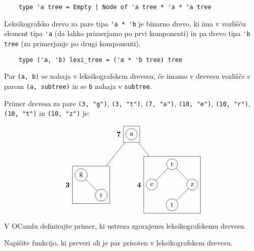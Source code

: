 \documentclass[arhiv]{../izpit}
\begin{document}
\begin{verbatim}
    type 'a tree = Empty | Node of 'a tree * 'a * 'a tree
\end{verbatim}

Leksikografsko drevo za pare tipa \verb|'a * 'b| je binarno drevo, ki ima v
vozlišču element tipa \verb|'a| (da lahko primerjamo po prvi komponenti) in pa drevo tipa \verb|'b tree| (za primerjanje po drugi komponenti).

\begin{verbatim}
    type ('a, 'b) lexi_tree = ('a * 'b tree) tree
\end{verbatim}

Par \verb|(a, b)| se nahaja v leksikografskem drevesu, če imamo v drevesu vozlišče s parom \verb|(a, subtree)| in se \verb|b| nahaja v \verb|subtree|.

Primer drevesa za pare \verb|(3, "g")|, \verb|(3, "t")|, \verb|(7, "a")|, \verb|(10, "e")|, \verb|(10, "r")|, \verb|(10, "t")| in \verb|(10, "z")| je:

\[
  \begin{tikzpicture}[level distance=2.5cm,
    level 1/.style={sibling distance=4cm},
    level 2/.style={sibling distance=2cm}
    ]
    \node[rectangle, draw, label=left:\textbf{7}] 
        {\begin{tikzpicture}[level distance=1cm]
            \node [circle,draw] {a};
        \end{tikzpicture}}
    child {node [rectangle, draw, label=left:\textbf{3}] 
        {\begin{tikzpicture}[level distance=1cm, level 1/.style={sibling distance=1cm}]
            \node [circle,draw] {g}
                child { node [circle,draw, xshift=1cm] {t}};
        \end{tikzpicture}}
        }
    child {node [rectangle, draw, label=left:\textbf{4}] 
        {\begin{tikzpicture}[level distance=1cm, level 1/.style={sibling distance=1cm}]
            \node [circle,draw] {r}
                child { node [circle,draw] {e}}
                child { node [circle,draw] {z}
                    child {node [circle,draw, xshift=-1cm] {t}}};
        \end{tikzpicture}}
        }
    ;
  \end{tikzpicture}
\]


\podnaloga 
V OCamlu definirajte primer, ki ustreza zgornjemu leksikografskemu drevesu.

\podnaloga 
Napišite funkcijo, ki preveri ali je par prisoten v leksikografskem drevesu.
\end{document}
